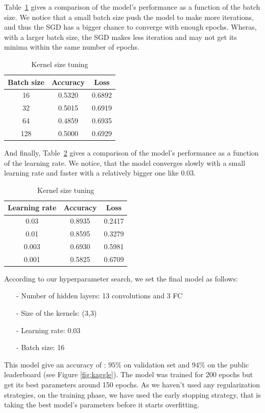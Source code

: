 \documentclass[a4paper]{article}
\begin{document}
Table~\ref{table:3} gives a comparison of the model's performance as a function of the batch size. We notice that a small batch size push the model to make more iterations, and thus the SGD has a bigger chance to converge with enough epochs. Wheras, with a larger batch size, the SGD makes less iteration and may not get its minima within the same number of epochs.
%
\begin{table}[h!]
	\centering
	\begin{tabular}{||c c c||} 
		\hline
		Batch size & Accuracy & Loss \\ [0.5ex] 
		\hline\hline
		16 & 0.5320 & 0.6892 \\ 
		32 & 0.5015 & 0.6919 \\ 
		64 & 0.4859 & 0.6935 \\ 
		128 & 0.5000 & 0.6929 \\ [1ex]  
		\hline
	\end{tabular}
	\caption{Kernel size tuning}
	\label{table:3}
\end{table}

And finally, Table~\ref{table:4} gives a comparison of the model's performance as a function of the learning rate. We notice, that the model converges slowly with a small learning rate and faster with a relatively bigger one like 0.03.

\begin{table}[h!]
	\centering
	\begin{tabular}{||c c c||} 
		\hline
		Learning rate & Accuracy & Loss \\ [0.5ex] 
		\hline\hline
		0.03 & 0.8935 & 0.2417 \\ 
		0.01 & 0.8595 & 0.3279 \\ 
		0.003 & 0.6930 & 0.5981 \\
		0.001 & 0.5825 & 0.6709 \\ [1ex]  
		\hline
	\end{tabular}
	\caption{Kernel size tuning}
	\label{table:4}
\end{table}

According to our hyperparameter search, we set the final model as follows:
\begin{itemize}
\setlength\itemsep{0em}
\item[-]Number of hidden layers: 13 convolutions and 3 FC
\item[-]Size of the kernels: (3,3)
\item[-]Learning rate: 0.03
\item[-]Batch size: 16
\end{itemize}
%
This model give an accuracy of : $95\%$ on validation set and $94\%$ on the public leaderboard (see Figure \ref{fig:kaggle}). The model was trained for 200 epochs but get its best parameters around 150 epochs.
%
As we haven't used any regularization strategies, on the training phase, we have used the early stopping strategy, that is taking the best model's parameters before it starts overfitting.
\end{document}

